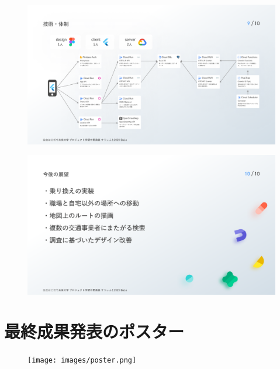 \begin{figure}[htbp]
    \includegraphics[width=14cm]{images/slide9.png}
    \label{fig:slide9}
\end{figure}
\begin{figure}[htbp]
    \includegraphics[width=14cm]{images/slide10.png}
    \label{fig:slide10}
\end{figure}

\section{最終成果発表のポスター}
\begin{figure}[htbp]
    \centering
    \texttt{[image: images/poster.png]}
\end{figure}
